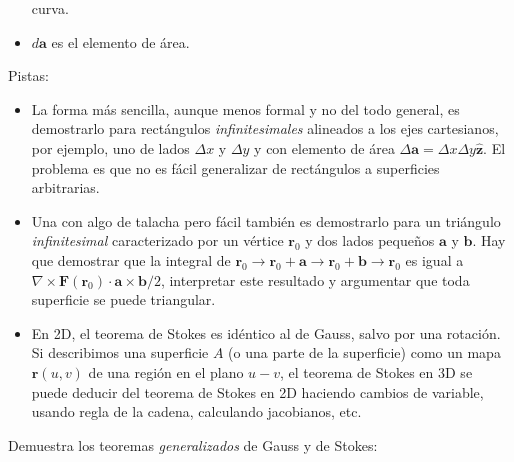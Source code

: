\documentclass{exam}
\begin{document}
\begin{questions}
\begin{itemize}
    curva.
  \item $d\bm a$ es el elemento de área.
  \end{itemize}
  Pistas:
  \begin{itemize}
  \item La forma más sencilla, aunque menos formal y no del todo general, es demostrarlo
    para rectángulos {\em infinitesimales} alineados a los ejes
    cartesianos, por ejemplo, uno de lados $\Delta x$ y $\Delta y$ y
    con elemento de área $\Delta \bm a=\Delta
    x\Delta y\hat{\bm z}$. El problema es que no es fácil generalizar de rectángulos a
    superficies arbitrarias.
  \item Una con algo de talacha pero fácil también es demostrarlo para
    un triángulo {\em infinitesimal} caracterizado por un vértice $\bm
    r_0$ y dos lados pequeños $\bm a$ y $\bm b$. Hay que demostrar que
    la integral de $\bm r_0\to\bm r_0+\bm a\to\bm r_0+\bm b\to\bm r_0$
    es igual a $\nabla\times\bm F(\bm r_0)\cdot\bm a\times\bm b/2$,
    interpretar este resultado y argumentar que toda superficie se
    puede triangular.
  \item En 2D, el teorema de Stokes es idéntico al de
    Gauss, salvo por una rotación. Si describimos una superficie $A$ (o una
    parte de la superficie) como un mapa $\bm r(u,v)$ de una región en el plano
    $u-v$, el teorema de Stokes en 3D se puede deducir del teorema de
    Stokes en 2D haciendo cambios de variable, usando regla de la
    cadena, calculando jacobianos, etc.
  \end{itemize}
  \question Demuestra los teoremas {\em generalizados} de Gauss y de Stokes:
\end{questions}
\end{document}
